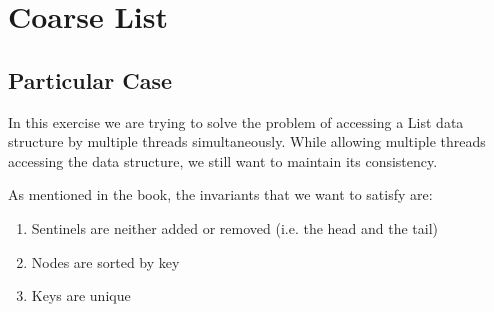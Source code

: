 \section{\textbf{Coarse List}}
\subsection{Particular Case}
\par
In this exercise we are trying to solve the problem of accessing a List data
structure by multiple threads simultaneously. While allowing multiple threads
accessing the data structure, we still want to maintain its consistency. 
\par
As mentioned in the book, the invariants that we want to satisfy are:
\par
\begin{enumerate}
\item Sentinels are neither added or removed (i.e. the head and the tail)
\item Nodes are sorted by key
\item Keys are unique
\end{enumerate}
\par
